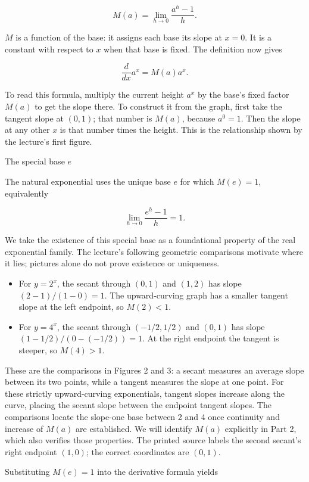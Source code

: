 \documentclass[
  11pt,
]{article}
\providecommand{\tightlist}{%
  \setlength{\itemsep}{0pt}\setlength{\parskip}{0pt}}
\providecommand{\gt}{>}
\providecommand{\lt}{<}
\begin{document}
\[
M(a)=\lim_{h\to0}\frac{a^h-1}{h}.
\]

\(M\) is a function of the base: it assigns each base its slope at
\(x=0\). It is a constant with respect to \(x\) when that base is fixed.
The definition now gives

\[
\frac{d}{dx}a^x=M(a)a^x.
\]

To read this formula, multiply the current height \(a^x\) by the base's
fixed factor \(M(a)\) to get the slope there. To construct it from the
graph, first take the tangent slope at \((0,1)\); that number is
\(M(a)\), because \(a^0=1\). Then the slope at any other \(x\) is that
number times the height. This is the relationship shown by the lecture's
first figure.

The special base \(e\)

The natural exponential uses the unique base \(e\) for which \(M(e)=1\),
equivalently

\[
\lim_{h\to0}\frac{e^h-1}{h}=1.
\]

We take the existence of this special base as a foundational property of
the real exponential family. The lecture's following geometric
comparisons motivate where it lies; pictures alone do not prove
existence or uniqueness.

\begin{itemize}
\tightlist
\item
  For \(y=2^x\), the secant through \((0,1)\) and \((1,2)\) has slope
  \((2-1)/(1-0)=1\). The upward-curving graph has a smaller tangent
  slope at the left endpoint, so \(M(2)\lt 1\).
\item
  For \(y=4^x\), the secant through \((-1/2,1/2)\) and \((0,1)\) has
  slope \((1-1/2)/(0-(-1/2))=1\). At the right endpoint the tangent is
  steeper, so \(M(4)\gt 1\).
\end{itemize}

These are the comparisons in Figures 2 and 3: a secant measures an
average slope between its two points, while a tangent measures the slope
at one point. For these strictly upward-curving exponentials, tangent
slopes increase along the curve, placing the secant slope between the
endpoint tangent slopes. The comparisons locate the slope-one base
between 2 and 4 once continuity and increase of \(M(a)\) are
established. We will identify \(M(a)\) explicitly in Part 2, which also
verifies those properties. The printed source labels the second secant's
right endpoint \((1,0)\); the correct coordinates are \((0,1)\).

Substituting \(M(e)=1\) into the derivative formula yields
\end{document}
